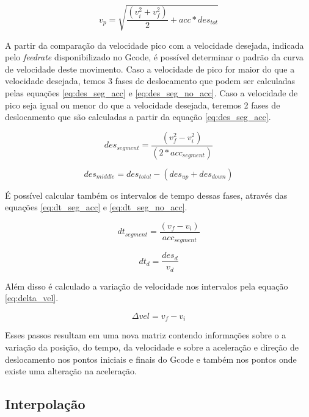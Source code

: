 \begin{equation}
    \label{eq:v_p}
    v_p = \sqrt{\frac{(v_i^2+v_f^2)}{2}+acc*des_{tot}}
\end{equation}

A partir da comparação da velocidade pico com a velocidade desejada, indicada pelo \textit{feedrate} disponibilizado no Gcode,
é possível determinar o padrão da curva de velocidade deste movimento.
Caso a velocidade de pico for maior do que a velocidade desejada, temos 3 fases de deslocamento
que podem ser calculadas pelas equações \ref{eq:des_seg_acc} e \ref{eq:des_seg_no_acc}.
Caso a velocidade de pico seja igual ou menor do que a velocidade desejada, teremos 2 fases de deslocamento
que são calculadas a partir da equação \ref{eq:des_seg_acc}.

\begin{equation}
    \label{eq:des_seg_acc}
    des_{segment} = \frac{(v_f^2-v_i^2)}{(2*acc_{segment})}
\end{equation}

\begin{equation}
    \label{eq:des_seg_no_acc}
    des_{middle} = des_{total}-(des_{up}+des_{down})
\end{equation}

É possível calcular também os intervalos de tempo dessas fases, através das 
equações \ref{eq:dt_seg_acc} e \ref{eq:dt_seg_no_acc}.

\begin{equation}
    \label{eq:dt_seg_acc}
    dt_{segment} = \frac{(v_f-v_i)}{acc_{segment}}
\end{equation}

\begin{equation}
    \label{eq:dt_seg_no_acc}
    dt_d = \frac{des_d}{v_d}
\end{equation}

Além disso é calculado a variação de velocidade nos intervalos pela equação \ref{eq:delta_vel}.

\begin{equation}
    \label{eq:delta_vel}
    \Delta vel = v_f-v_i
\end{equation}

Esses passos resultam em uma nova matriz contendo informações
sobre o a variação da posição, do tempo, da velocidade e sobre a aceleração e 
direção de deslocamento nos pontos iniciais e finais do Gcode e também nos pontos
onde existe uma alteração na aceleração.

\subsection{Interpolação}

